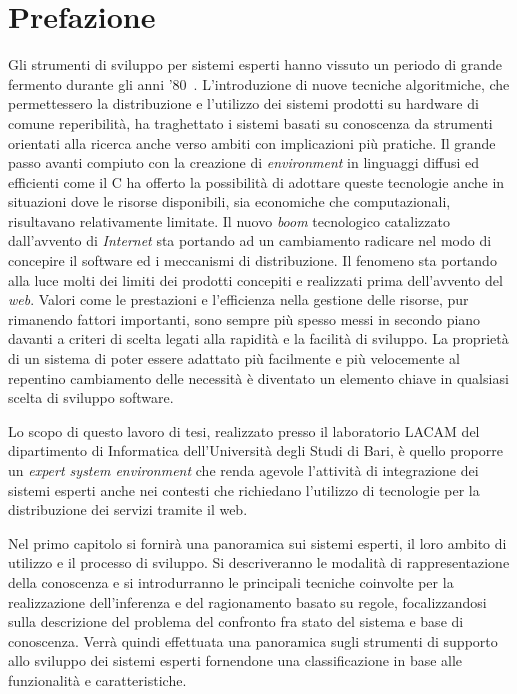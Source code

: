 \chapter*{Prefazione}
\rhead{}

Gli strumenti di sviluppo per sistemi esperti hanno vissuto un periodo di grande fermento durante gli anni '80~\cite{21aiproud}. L'introduzione di nuove tecniche algoritmiche, che permettessero la distribuzione e l'utilizzo dei sistemi prodotti su hardware di comune reperibilità, ha traghettato i sistemi basati su conoscenza da strumenti orientati alla ricerca anche verso ambiti con implicazioni più pratiche. Il grande passo avanti compiuto con la creazione di \emph{environment} in linguaggi diffusi ed efficienti come il C ha offerto la possibilità di adottare queste tecnologie anche in situazioni dove le risorse disponibili, sia economiche che computazionali, risultavano relativamente limitate. Il nuovo \emph{boom} tecnologico catalizzato dall'avvento di \emph{Internet} sta portando ad un cambiamento radicare nel modo di concepire il software ed i meccanismi di distribuzione. Il fenomeno sta portando alla luce molti dei limiti dei prodotti concepiti e realizzati prima dell'avvento del \emph{web}. Valori come le prestazioni e l'efficienza nella gestione delle risorse, pur rimanendo fattori importanti, sono sempre più spesso messi in secondo piano davanti a criteri di scelta legati alla rapidità e la facilità di sviluppo. La proprietà di un sistema di poter essere adattato più facilmente e più velocemente al repentino cambiamento delle necessità  è diventato un elemento chiave in qualsiasi scelta di sviluppo software.

Lo scopo di questo lavoro di tesi, realizzato presso il laboratorio LACAM del dipartimento di Informatica dell'Università degli Studi di Bari, è quello proporre un \emph{expert system environment} che renda agevole l'attività di integrazione dei sistemi esperti anche nei contesti che richiedano l'utilizzo di tecnologie per la distribuzione dei servizi tramite il web.

Nel primo capitolo si fornirà una panoramica sui sistemi esperti, il loro ambito di utilizzo e il processo di sviluppo. Si descriveranno le modalità di rappresentazione della conoscenza e si introdurranno le principali tecniche coinvolte per la realizzazione dell'inferenza e del ragionamento basato su regole, focalizzandosi sulla descrizione del problema del confronto fra stato del sistema e base di conoscenza. Verrà quindi effettuata una panoramica sugli strumenti di supporto allo sviluppo dei sistemi esperti fornendone una classificazione in base alle funzionalità e caratteristiche.

